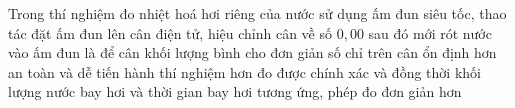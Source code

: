 





\begin{ex}
	{\color{red}\footnotesize\ttfamily [L12C1B1-TN-34]}\par %
	Trong thí nghiệm đo nhiệt hoá hơi riêng của nước sử dụng ấm đun siêu tốc, thao tác đặt ấm đun lên cân điện tử, hiệu chỉnh cân về số $0,00$ sau đó mới rót nước vào ấm đun là để
	\choice
	{cân khối lượng bình cho đơn giản}
	{số chỉ trên cân ổn định hơn}
	{an toàn và dễ tiến hành thí nghiệm hơn}
	{\True đo được chính xác và đồng thời khối lượng nước bay hơi và thời gian bay hơi tương ứng, phép đo đơn giản hơn}
\end{ex}

